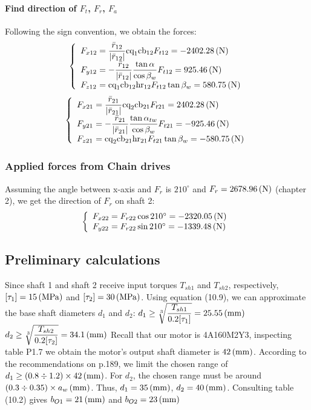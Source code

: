 \paragraph{Find direction of $ F_{t} $, $ F_r $, $ F_a $}
Following the sign convention, we obtain the forces:
\[
\left\{ 
\begin{array}{l@{{}={}}l}
F_{x12}& \dfrac{\bar{r}_{12}}{|\bar{r}_{12}|}\text{cq}_1\text{cb}_{12}F_{t12}= -2402.28 \unitp{N}\\
F_{y12}& -\dfrac{\bar{r}_{12}}{|\bar{r}_{12}|}\dfrac{\tan\alpha}{\cos\beta_w}F_{t12}= 925.46 \unitp{N}\\
F_{z12}& \text{cq}_1\text{cb}_{12}\text{hr}_{12}F_{t12}\tan\beta_w= 580.75 \unitp{N}\\ 
\end{array}
\right.
\]
\[
\left\{ 
\begin{array}{l@{{}={}}l}
F_{x21}& \dfrac{\bar{r}_{21}}{|\bar{r}_{21}|}\text{cq}_2\text{cb}_{21}F_{t21}= 2402.28 \unitp{N}\\
F_{y21}& -\dfrac{\bar{r}_{21}}{|\bar{r}_{21}|}\dfrac{\tan\alpha_{tw}}{\cos\beta_w}F_{t21}= -925.46 \unitp{N}\\
F_{z21}& \text{cq}_2\text{cb}_{21}\text{hr}_{21}F_{t21}\tan\beta_w= -580.75 \unitp{N}\\ 
\end{array}
\right.
\]

\subsubsection{Applied forces from Chain drives}
Assuming the angle between x-axis and $ F_r $ is $ 210^\circ $ and $ F_r = 2678.96 \, (\mathrm{N}) $ (chapter 2), we get the direction of $ F_r $ on shaft 2:
\[
\left\{ 
\begin{array}{l@{{}={}}l}
F_{x22}& F_{r22}\cos210^\circ= -2320.05 \unitp{N}\\
F_{y22}& F_{r22}\sin210^\circ= -1339.48 \unitp{N}\\
\end{array}
\right.
\]

\subsection{Preliminary calculations}
Since shaft 1 and shaft 2 receive input torques $ T_{sh1} $ and $ T_{sh2} $, respectively, $ [\tau_1] = 15\, (\mathrm{MPa})$ and $ [\tau_2]=30\, (\mathrm{MPa}) $. Using equation (10.9), we can approximate the base shaft diameters $ d_1 $ and $ d_2 $:\vskip2mm
$ d_1 \geq \sqrt[3]{\dfrac{T_{sh1}}{0.2[\tau_1]}} = 25.55 \, (\mathrm{mm})$\\
$ d_2 \geq \sqrt[3]{\dfrac{T_{sh2}}{0.2[\tau_2]}} = 34.1 \, (\mathrm{mm})$\vskip2mm
Recall that our motor is 4A160M2Y3, inspecting table P1.7 we obtain the motor's output shaft diameter is $ 42 \, (\mathrm{mm}) $. According to the recommendations on p.189, we limit the chosen range of $ d_1 \geq (0.8\div1.2)\times 42\, (\mathrm{mm}) $. For $ d_2 $, the chosen range must be around $ (0.3\div0.35)\times a_w\, (\mathrm{mm})$. Thus, $ d_1 = 35\, (\mathrm{mm}) $, $ d_2 = 40\, (\mathrm{mm}) $. Consulting table (10.2) gives $ b_{O1} = 21\, (\mathrm{mm}) $ and $ b_{O2} = 23\, (\mathrm{mm}) $

